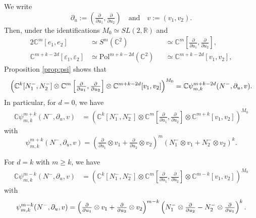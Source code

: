\documentclass[reqno,11pt]{amsart}
\theoremstyle{remark}
\numberwithin{equation}{section}
\newcommand{\eps}{\varepsilon}
\newcommand{\R}{\mathbb{R}}
\newcommand{\C}{\mathbb{C}}
\newcommand{\Pol}{\mathrm{Pol}}
\begin{document}
We write
\begin{equation*}
\partial_u:=\left(\tfrac{\partial}{\partial u_1}, \tfrac{\partial}{\partial u_2}\right)
\quad \text{and} \quad
v:=(v_1, v_2).
\end{equation*}
Then, under the identifications $M_0 \simeq SL(2,\R)$ and
\begin{alignat*}{2}
\C^m[e_1, e_2] &\simeq S^m(\C^2)&&\simeq \C^m\left[\tfrac{\partial}{\partial u_1}, \tfrac{\partial}{\partial u_2}\right],\\[5pt]
\C^{m+k-2d}[\eps_1, \eps_2]&\simeq \Pol^{m+k-2d}(\C^2)&&\simeq 
\C^{m+k-2d}[v_1, v_2],
\end{alignat*}
Proposition \ref{prop:psi} shows that
\begin{equation*}
\left(\C^k[N_1^-, N_2^-] \otimes 
\C^m\left[\tfrac{\partial}{\partial u_1}, \tfrac{\partial}{\partial u_2}\right]
\otimes 
\C^{m+k-2d}[v_1, v_2]\right)^{M_0}
=\C\psi^{m+k-2d}_{m,k}(N^-,\partial_u,v).\\[3pt]
\end{equation*}
In particular, for $d=0$, we have 
\begin{align*}
\C
\psi^{m+k}_{m,k}(N^-,\partial_u,v)
&=
\left(\C^k[N_1^-, N_2^-] \otimes 
\C^m\left[\tfrac{\partial}{\partial u_1}, \tfrac{\partial}{\partial u_2}\right]
\otimes 
\C^{m+k}[v_1, v_2]\right)^{M_0}
\end{align*}
with
\begin{equation*}
\psi^{m+k}_{m,k}(N^-,\partial_u,v)
=
\left(\tfrac{\partial}{\partial u_1}\otimes v_1 + \tfrac{\partial}{\partial u_2}\otimes v_2\right)^m
\left(N_1^-\otimes v_1 + N_2^-\otimes v_2\right)^k.
\end{equation*}

\vskip 0.1in

For $d=k$ with $m\geq k$, we have 
\begin{align*}
\C
\psi^{m-k}_{m,k}(N^-,\partial_u,v)
&=
\left(\C^k[N_1^-, N_2^-] \otimes 
\C^m\left[\tfrac{\partial}{\partial u_1}, \tfrac{\partial}{\partial u_2}\right]
\otimes 
\C^{m-k}[v_1, v_2]\right)^{M_0}
\end{align*}
with
\begin{equation*}
\psi^{m-k}_{m,k}(N^-,\partial_u,v)
=
\left(\tfrac{\partial}{\partial u_1}\otimes v_1 + \tfrac{\partial}{\partial u_2}\otimes v_2\right)^{m-k}
\left(N_1^-\otimes\tfrac{\partial}{\partial u_2} - N_2^-\otimes \tfrac{\partial}{\partial u_1}\right)^k.\\[3pt]
\end{equation*}
\end{document}
